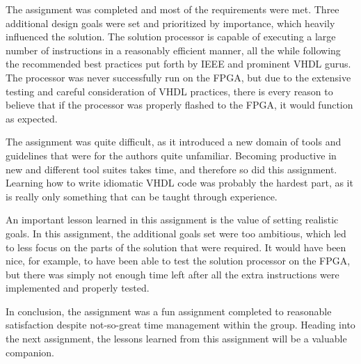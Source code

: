 The assignment was completed and most of the requirements were met.
Three additional design goals were set and prioritized by importance, which heavily influenced the solution.
The solution processor is capable of executing a large number of instructions in a reasonably efficient manner, all the while following the recommended best practices put forth by IEEE and prominent VHDL gurus.
The processor was never successfully run on the FPGA, but due to the extensive testing and careful consideration of VHDL practices, there is every reason to believe that if the processor was properly flashed to the FPGA, it would function as expected.

The assignment was quite difficult, as it introduced a new domain of tools and guidelines that were for the authors quite unfamiliar.
Becoming productive in new and different tool suites takes time, and therefore so did this assignment.
Learning how to write idiomatic VHDL code was probably the hardest part, as it is really only something that can be taught through experience.

An important lesson learned in this assignment is the value of setting realistic goals.
In this assignment, the additional goals set were too ambitious, which led to less focus on the parts of the solution that were required.
It would have been nice, for example, to have been able to test the solution processor on the FPGA, but there was simply not enough time left after all the extra instructions were implemented and properly tested.

In conclusion, the assignment was a fun assignment completed to reasonable satisfaction despite not-so-great time management within the group.
Heading into the next assignment, the lessons learned from this assignment will be a valuable companion.

